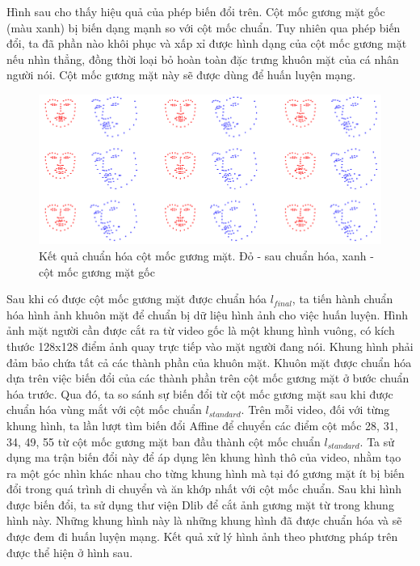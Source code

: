 Hình sau cho thấy hiệu quả của phép biến đổi trên. Cột mốc gương mặt gốc (màu xanh) bị biến dạng mạnh so với cột mốc chuẩn. Tuy nhiên qua phép biến đổi, ta đã phần nào khôi phục và xấp xỉ được hình dạng của cột mốc gương mặt nếu nhìn thẳng, đồng thời loại bỏ hoàn toàn đặc trưng khuôn mặt của cá nhân người nói. Cột mốc gương mặt này sẽ được dùng để huấn luyện mạng.

\begin{figure}[H]
    \centering
    \includegraphics[width=15cm]{./content/materials/standardize_landmark.png}
    \caption{Kết quả chuẩn hóa cột mốc gương mặt. Đỏ - sau chuẩn hóa, xanh - cột mốc gương mặt gốc}
\end{figure}

Sau khi có được cột mốc gương mặt được chuẩn hóa $l_{final}$, ta tiến hành chuẩn hóa hình ảnh khuôn mặt để chuẩn bị dữ liệu hình ảnh cho việc huấn luyện. Hình ảnh mặt người cần được cắt ra từ video gốc là một khung hình vuông, có kích thước 128x128 điểm ảnh quay trực tiếp vào mặt người đang nói. Khung hình phải đảm bảo chứa tất cả các thành phần của khuôn mặt. Khuôn mặt được chuẩn hóa dựa trên việc biến đổi của các thành phần trên cột mốc gương mặt ở bước chuẩn hóa trước. Qua đó, ta so sánh sự biến đổi từ cột mốc gương mặt sau khi được chuẩn hóa vùng mắt với cột mốc chuẩn $l_{standard}$. Trên mỗi video, đối với từng khung hình, ta lần lượt tìm biến đổi Affine để chuyển các điểm cột mốc 28, 31, 34, 49, 55 từ cột mốc gương mặt ban đầu thành cột mốc chuẩn $l_{standard}$. Ta sử dụng ma trận biến đổi này để áp dụng lên khung hình thô của video, nhằm tạo ra một góc nhìn khác nhau cho từng khung hình mà tại đó gương mặt ít bị biến đổi trong quá trình di chuyển và ăn khớp nhất với cột mốc chuẩn. Sau khi hình được biến đổi, ta sử dụng thư viện Dlib để cắt ảnh gương mặt từ trong khung hình này. Những khung hình này là những khung hình đã được chuẩn hóa và sẽ được đem đi huấn luyện mạng. Kết quả xử lý hình ảnh theo phương pháp trên được thể hiện ở hình sau.

